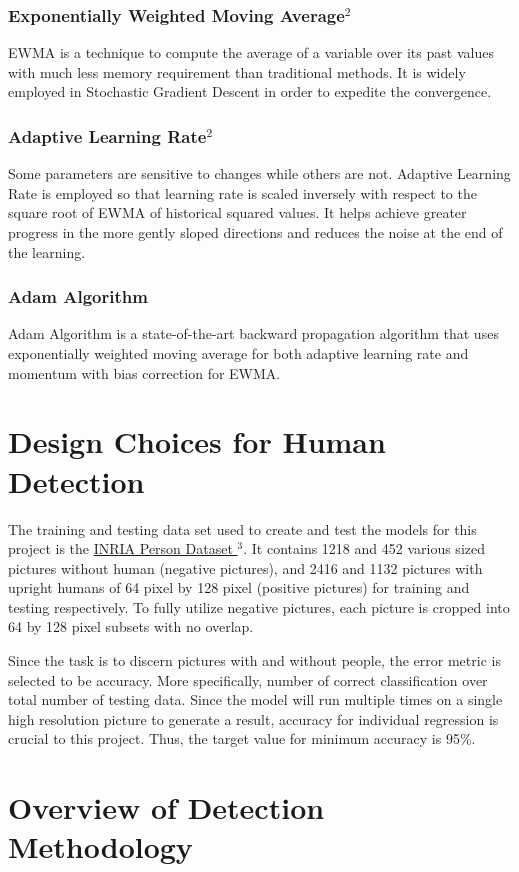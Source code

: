 \documentclass[twocolumn, 12pt]{article}
\begin{document}
\subsubsection*{Exponentially Weighted Moving Average$^2$}
EWMA is a technique to compute the average of a variable over its past values with much less memory requirement than traditional methods. It is widely employed in Stochastic Gradient Descent in order to expedite the convergence.
\subsubsection*{Adaptive Learning Rate$^2$}
Some parameters are sensitive to changes while others are not. Adaptive Learning Rate is employed so that learning rate is scaled inversely with respect to the square root of EWMA of historical squared values. It helps achieve greater progress in the more gently sloped directions and reduces the noise at the end of the learning.
\subsubsection*{Adam Algorithm}
Adam Algorithm is a state-of-the-art backward propagation algorithm that uses exponentially weighted moving average for both adaptive learning rate and momentum with bias correction for EWMA.
\section{Design Choices for Human Detection}
The training and testing data set used to create and test the models for this project is the \href{http://pascal.inrialpes.fr/data/human/}{INRIA Person Dataset $^3$}. It contains 1218 and 452 various sized pictures without human (negative pictures), and 2416 and 1132 pictures with upright humans of 64 pixel by 128 pixel (positive pictures) for training and testing respectively. To fully utilize negative pictures, each picture is cropped into 64 by 128 pixel subsets with no overlap.

Since the task is to discern pictures with and without people, the error metric is selected to be accuracy. More specifically, number of correct classification over total number of testing data. Since the model will run multiple times on a single high resolution picture to generate a result, accuracy for individual regression is crucial to this project. Thus, the target value for minimum accuracy is 95\%. 

\section{Overview of Detection Methodology}
\end{document}
